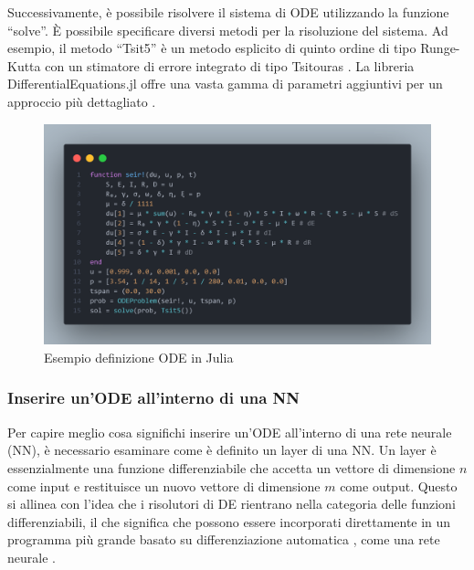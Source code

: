 Successivamente, è possibile risolvere il sistema di ODE utilizzando la 
funzione ``solve''. È possibile specificare diversi metodi per la 
risoluzione del sistema. Ad esempio, il metodo ``Tsit5'' è un metodo 
esplicito di quinto ordine di tipo Runge-Kutta con un stimatore di 
errore integrato di tipo Tsitouras \cite{10.1016/j.camwa.2011.06.002}. 
La libreria DifferentialEquations.jl offre una vasta gamma di parametri 
aggiuntivi per un approccio più dettagliato \cite{rackauckas2017differentialequations}.

\begin{figure}[H]
    \begin{center}
        \includegraphics[width=\textwidth]{img/fdefinition.png}
        \caption{Esempio definizione ODE in Julia}
        \label{fig:ODE_Julia_example}
    \end{center}
\end{figure}

\subsubsection{Inserire un'ODE all'interno di una NN}

Per capire meglio cosa significhi inserire un'ODE all'interno di una 
rete neurale (NN), è necessario esaminare come è definito un layer di 
una NN. Un layer è essenzialmente una funzione differenziabile che 
accetta un vettore di dimensione $n$ come input e restituisce un nuovo 
vettore di dimensione $m$ come output. Questo si allinea con l'idea che 
i risolutori di DE rientrano nella categoria delle funzioni 
differenziabili, il che significa che possono essere incorporati 
direttamente in un programma più grande basato su differenziazione 
automatica \cite{BARTHOLOMEWBIGGS2000171}, come una rete neurale \cite{innes2018fashionable} \cite{pal2023lux}. 

